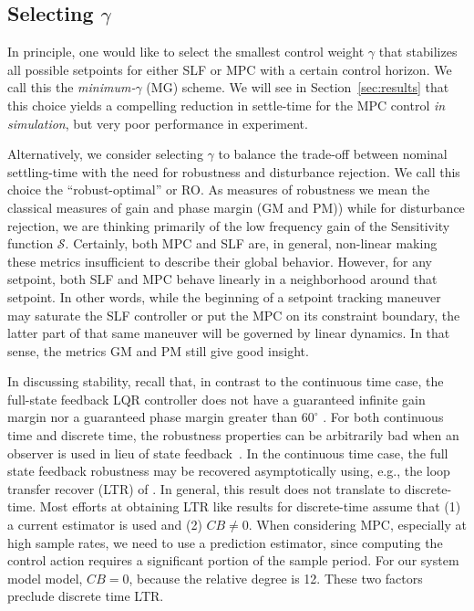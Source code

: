 \documentclass[journal,twocolumn,twoside]{IEEEtran}
\begin{document}
\subsection{Selecting $\gamma$}
In principle, one would like to select the smallest control weight $\gamma$ that stabilizes all possible setpoints for either SLF or MPC with a certain control horizon. We call this the \emph{minimum-$\gamma$} (MG) scheme. We will see in Section~\ref{sec:results} that this choice yields a compelling reduction in settle-time for the MPC control \emph{in simulation}, but very poor performance in experiment.

Alternatively, we consider selecting $\gamma$ to balance the trade-off between nominal settling-time with the need for robustness and disturbance rejection. We call this choice the ``robust-optimal'' or RO. As measures of robustness we mean the classical measures of gain and phase margin (GM and PM)) while for disturbance rejection, we are thinking primarily of the low frequency gain of the Sensitivity function $\mathcal{S}$. Certainly, both MPC and SLF are, in general, non-linear making these metrics insufficient to describe their global behavior. However, for any setpoint, both SLF and MPC behave linearly in a neighborhood around that setpoint. In other words, while the beginning of a setpoint tracking maneuver may saturate the SLF controller or put the MPC on its constraint boundary, the latter part of that same maneuver will be governed by linear dynamics. In that sense, the metrics GM and PM still give good insight. %

In discussing stability, recall that, in contrast to the continuous time case, the full-state feedback LQR controller does not have a guaranteed infinite gain margin nor a guaranteed phase margin greater than $60^{\circ}$ \cite{andersson_moore}. For both continuous time and discrete time, the robustness properties can be arbitrarily bad when an observer is used in lieu of state feedback~\cite{doyle_guaranteed_1978}. In the continuous time case, the full state feedback robustness may be recovered asymptotically using, e.g., the loop transfer recover (LTR) of \cite{doyle_robustness_1979}. In general, this result does not translate to discrete-time. Most efforts at obtaining LTR like results for discrete-time assume that (1) a current estimator is used and (2) $CB\neq 0$. When considering MPC, especially at high sample rates, we need to use a prediction estimator, since computing the control action requires a significant portion of the sample period. For our system model model, $CB=0$, because the relative degree is 12. These two factors preclude discrete time LTR. 
\end{document}
